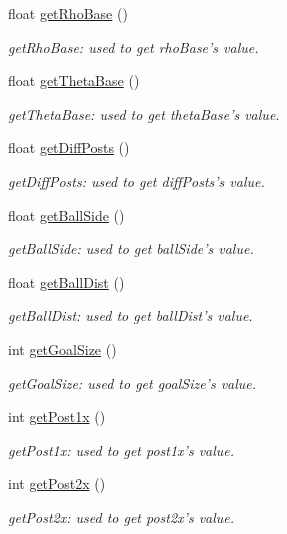 \begin{DoxyCompactItemize}
float \hyperlink{classVS_a9b8e5c156f4fbeb89e07a80f2b900a05}{get\-Rho\-Base} ()
\begin{DoxyCompactList}\small\item\em get\-Rho\-Base\-: used to get rho\-Base's value. \end{DoxyCompactList}\item 
float \hyperlink{classVS_a4037f73e07517abd2ef702f77020a5d9}{get\-Theta\-Base} ()
\begin{DoxyCompactList}\small\item\em get\-Theta\-Base\-: used to get theta\-Base's value. \end{DoxyCompactList}\item 
float \hyperlink{classVS_a051485ededc5f0c90a341fb27db13918}{get\-Diff\-Posts} ()
\begin{DoxyCompactList}\small\item\em get\-Diff\-Posts\-: used to get diff\-Posts's value. \end{DoxyCompactList}\item 
float \hyperlink{classVS_a9bc32f35bce28e438277f25545582b43}{get\-Ball\-Side} ()
\begin{DoxyCompactList}\small\item\em get\-Ball\-Side\-: used to get ball\-Side's value. \end{DoxyCompactList}\item 
float \hyperlink{classVS_abe6a81f192c846bd22fdca4016a3c010}{get\-Ball\-Dist} ()
\begin{DoxyCompactList}\small\item\em get\-Ball\-Dist\-: used to get ball\-Dist's value. \end{DoxyCompactList}\item 
int \hyperlink{classVS_afe3373b47cafcb04953e19d67cf522bb}{get\-Goal\-Size} ()
\begin{DoxyCompactList}\small\item\em get\-Goal\-Size\-: used to get goal\-Size's value. \end{DoxyCompactList}\item 
int \hyperlink{classVS_a14047a1e866946e919533d24876659bd}{get\-Post1x} ()
\begin{DoxyCompactList}\small\item\em get\-Post1x\-: used to get post1x's value. \end{DoxyCompactList}\item 
int \hyperlink{classVS_aca4138ae40190b6ac6f6cf247e8e3413}{get\-Post2x} ()
\begin{DoxyCompactList}\small\item\em get\-Post2x\-: used to get post2x's value. \end{DoxyCompactList}\item 

\end{DoxyCompactItemize}
